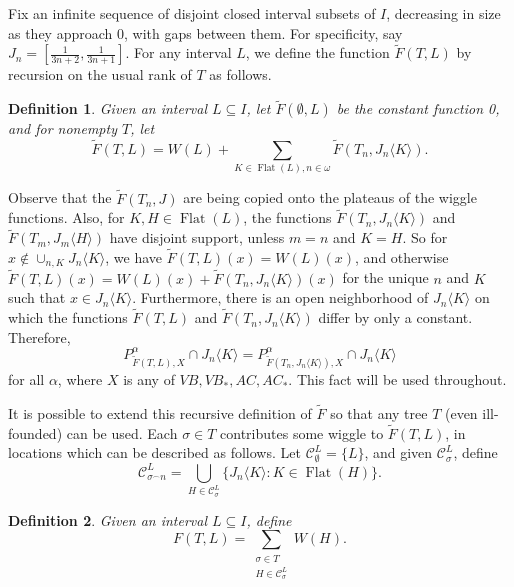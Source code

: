 \documentclass[12pt]{amsart}
\newtheorem{definition}{Definition}
\newcommand{\C}{\mathcal C}
\renewcommand{\flat}{\operatorname{Flat}}
\newcommand{\august}[1]{#1}%
\newcommand{\mathaugust}{}%
\newcommand{\strikethrough}[1]{}%
\begin{document}
Fix an infinite sequence of disjoint closed interval subsets of $I$, 
decreasing in size as they 
approach 0, with gaps between them.  For specificity, say
$J_n = [\frac{1}{3n+2},\frac{1}{3n+1}]$.
For any interval $L$, we define the function $\tilde F(T,L)$ by 
recursion on the usual rank of $T$ as follows.
\begin{definition}\label{tildeF} Given an interval $L\subseteq I$, let $\tilde F(\emptyset, L)$ 
be the constant function 0, and for nonempty $T$, let
$$\tilde F(T,L) = W(L) +
\sum_{K \in \flat(L), n \in \omega} \tilde F(T_n, J_n\langle K\rangle).$$
\end{definition}
Observe that the $\tilde F(T_n,J)$ are being copied onto the plateaus of the wiggle 
functions. \august{Also, for $K,H \in \flat(L)$, the functions 
$\tilde F(T_n, J_n\langle K \rangle)$ and 
$\tilde F(T_m, J_m\langle H \rangle)$ have disjoint support,
unless $m=n$ and $K=H$.  So for $x \not\in \cup_{n,K} J_n\langle K \rangle$, 
we have $\tilde F(T,L)(x) = W(L)(x)$, and otherwise 
$\tilde F(T,L)(x) = W(L)(x) + \tilde F(T_n, J_n\langle K \rangle)(x)$ 
for the unique $n$ and $K$ such that $x \in J_n\langle K \rangle$. 
Furthermore, there is an open neighborhood of 
$J_n\langle K \rangle$ on which the functions 
$\tilde F(T,L)$ and $\tilde F(T_n,J_n\langle K \rangle)$ differ by 
only a constant.  Therefore,}
$$\mathaugust{P^\alpha_{\tilde F(T,L),X} \cap J_n\langle K \rangle = 
P^\alpha_{\tilde F(T_n,J_n\langle K \rangle),X} \cap J_n\langle K \rangle}$$
\august{for all $\alpha$, where $X$ is any of $VB, VB_\ast, 
AC, AC_\ast$.  This fact will be used throughout.}

It is possible to extend this recursive definition of $\tilde F$ so that 
any tree $T$ (even ill-founded) can be used.  Each $\sigma \in T$ 
contributes some wiggle to $\tilde F(T,L)$, in locations which can be described 
as follows.  Let $\C_\emptyset^L = \{L\}$,  
and given $\C_\sigma^L$\strikethrough{for $|\sigma| \geq 1$}, define
$$\C_{\sigma^\smallfrown n}^L = \bigcup_{H \in \C_\sigma^L} \{J_n\langle K\rangle : K \in \flat(H)\}.$$

\begin{definition} Given an interval $L\subseteq I$, define
$$F(T,L) = \sum_{\substack{\sigma \in T \\ H \in \C_\sigma^L}} W(H).$$
\end{definition}
\end{document}
